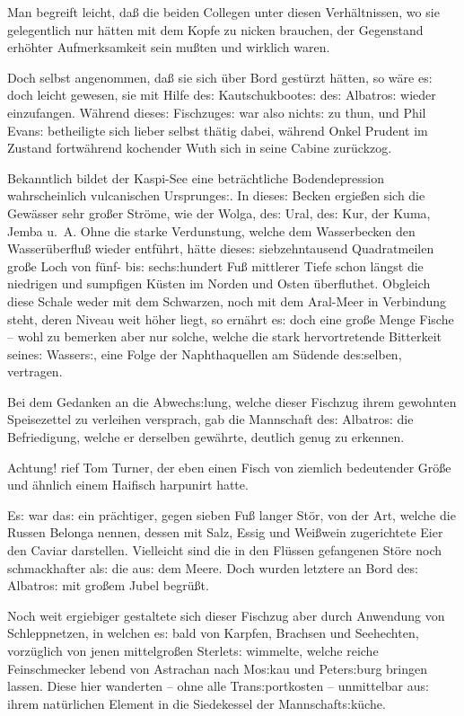 \documentclass[oneside,12pt]{book}
\newcommand{\s}{s:}
\begin{document}
Man begreift leicht, da{\ss} die beiden Collegen unter diesen
Verh\"altnissen, wo sie gelegentlich nur h\"atten mit dem Kopfe zu
nicken brauchen, der Gegenstand erh\"ohter Aufmerksamkeit sein
mu{\ss}ten und wirklich waren.

Doch selbst angenommen, da{\ss} sie sich \"uber Bord gest\"urzt
h\"atten, so w\"are e{\s} doch leicht gewesen, sie mit Hilfe de{\s}
Kautschukboote{\s} de{\s} {\glqq}Albatro{\s}{\grqq} wieder
einzufangen. W\"ahrend diese{\s} Fischzuge{\s} war also nicht{\s} zu
thun, und Phil Evan{\s} betheiligte sich lieber selbst th\"atig
dabei, w\"ahrend Onkel Prudent im Zustand fortw\"ahrend kochender
Wuth sich in seine Cabine zur\"uckzog.

Bekanntlich bildet der Kaspi-See eine betr\"achtliche Bodendepression
wahrscheinlich vulcanischen Ursprunge{\s}. In diese{\s} Becken
ergie{\ss}en sich die Gew\"asser sehr gro{\ss}er Str\"ome, wie der
Wolga, de{\s} Ural, de{\s} Kur, der Kuma, Jemba u.~A. Ohne die starke
Verdunstung, welche dem Wasserbecken den Wasser\"uberflu{\ss} wieder
entf\"uhrt, h\"atte diese{\s} siebzehntausend Quadratmeilen gro{\ss}e
Loch von f\"unf- bi{\s} sech{\s}hundert Fu{\ss} mittlerer Tiefe schon
l\"angst die niedrigen und sumpfigen K\"usten im Norden und Osten
\"uberfluthet. Obgleich diese Schale weder mit dem Schwarzen, noch
mit dem Aral-Meer in Verbindung steht, deren Niveau weit h\"oher
liegt, so ern\"ahrt e{\s} doch eine gro{\ss}e Menge Fische -- wohl zu
bemerken aber nur solche, welche die stark hervortretende Bitterkeit
seine{\s} Wasser{\s}, eine Folge der Naphthaquellen am S\"udende
de{\s}selben, vertragen.

Bei dem Gedanken an die Abwech{\s}lung, welche dieser Fischzug ihrem
gewohnten Speisezettel zu verleihen versprach, gab die Mannschaft
de{\s} {\glqq}Albatro{\s}{\grqq} die Befriedigung, welche er
derselben gew\"ahrte, deutlich genug zu erkennen.

{\glqq}Achtung!{\grqq} rief Tom Turner, der eben einen Fisch von
ziemlich bedeutender Gr\"o{\ss}e und \"ahnlich einem Haifisch
harpunirt hatte.

E{\s} war da{\s} ein pr\"achtiger, gegen sieben Fu{\ss} langer
St\"or, von der Art, welche die Russen Belonga nennen, dessen mit
Salz, Essig und Wei{\ss}wein zugerichtete Eier den Caviar darstellen.
Vielleicht sind die in den Fl\"ussen gefangenen St\"ore noch
schmackhafter al{\s} die au{\s} dem Meere. Doch wurden letztere an
Bord de{\s} {\glqq}Albatro{\s}{\grqq} mit gro{\ss}em Jubel
begr\"u{\ss}t.

Noch weit ergiebiger gestaltete sich dieser Fischzug aber durch
Anwendung von Schleppnetzen, in welchen e{\s} bald von Karpfen,
Brachsen und Seehechten, vorz\"uglich von jenen mittelgro{\ss}en
Sterlet{\s} wimmelte, welche reiche Feinschmecker lebend von
Astrachan nach Mo{\s}kau und Peter{\s}burg bringen lassen. Diese hier
wanderten -- ohne alle Tran{\s}portkosten -- unmittelbar au{\s} ihrem
nat\"urlichen Element in die Siedekessel der Mannschaft{\s}k\"uche.
\end{document}
